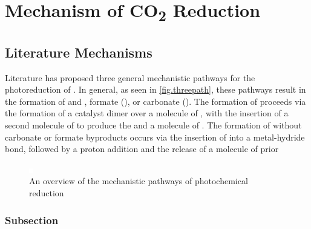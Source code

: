 \chapter{Mechanism of \texorpdfstring{CO\textsubscript{2}}{CO2} Reduction}\label{chap.mech}

\section{Literature Mechanisms}

Literature has proposed three general mechanistic pathways for the photoreduction of . In general, as seen in \autoref{fig.threepath}, these pathways result in the formation of  and , formate (), or carbonate (). The formation of  proceeds via the formation of a catalyst dimer over a molecule of , with the insertion of a second molecule of  to produce the  and a molecule of . The formation of  without carbonate or formate byproducts occurs via the insertion of  into a metal-hydride bond, followed by a proton addition and the release of a molecule of  prior

\begin{figure}[!htbp]
 \begin{center}
  \includegraphics[clip=true]{images/insertgraphic.eps}
 \end{center}
\caption[Overview of mechanistic pathways]{An overview of the mechanistic pathways of photochemical  reduction}
\label{fig.threepath}
\end{figure} 

\subsection{Subsection}

